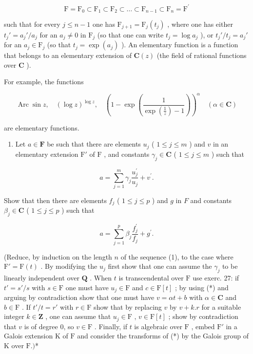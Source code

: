 \[
\mathrm{F} = \mathrm{F} _ {0} \subset \mathrm{F} _ {1} \subset \mathrm{F} _ {2} \subset \dots \subset \mathrm{F} _ {n - 1} \subset \mathrm{F} _ {n} = \mathrm{F} ^ {\prime}\tag{1}
\]

such that for every \(j \leqslant n - 1\) one has \(\mathrm{F}_{j + 1} = \mathrm{F}_j(t_j)\) , where one has either \(t_j' = a_j' / a_j\) for an \(a_j \neq 0\) in \(\mathrm{F}_j\) (so that one can write \(t_j = \log a_j\) ), or \(t_j' / t_j = a_j'\) for an \(a_j \in \mathrm{F}_j\) (so that \(t_j = \exp(a_j)\) ). An elementary function is a function that belongs to an elementary extension of \(\mathbf{C}(z)\) (the field of rational functions over \(\mathbf{C}\) ).

For example, the functions

\[
\operatorname{Arc} \sin z, \quad (\log z) ^ {\log z}, \quad \left(1 - \exp \left(\frac {1}{\exp \left(\frac {1}{z}\right) - 1}\right)\right) ^ {\alpha} \quad (\alpha \in \mathbf {C})
\]

are elementary functions.

\begin{enumerate}
\def\labelenumi{\alph{enumi})}
\setcounter{enumi}{1}
\tightlist
\item
  Let \(a \in \mathbf{F}\) be such that there are elements \(u_{j}\) ( \(1 \leqslant j \leqslant m\) ) and \(v\) in an elementary extension \(\mathrm{F}'\) of \(\mathrm{F}\) , and constants \(\gamma_{j} \in \mathbf{C}\) ( \(1 \leqslant j \leqslant m\) ) such that
\end{enumerate}

\[
a = \sum_ {j = 1} ^ {m} \gamma_ {j} \frac {u _ {j} ^ {\prime}}{u _ {j}} + v ^ {\prime}.\tag{*}
\]

Show that then there are elements \(f_{j}\) ( \(1 \leqslant j \leqslant p\) ) and \(g\) in \(F\) and constants \(\beta_{j} \in \mathbf{C}\) ( \(1 \leqslant j \leqslant p\) ) such that

\[
a = \sum_ {j = 1} ^ {p} \beta_ {j} \frac {f _ {j} ^ {\prime}}{f _ {j}} + g ^ {\prime}.\tag{**}
\]

(Reduce, by induction on the length \(n\) of the sequence (1), to the case where \(\mathrm{F}' = \mathrm{F}(t)\) . By modifying the \(u_{j}\) first show that one can assume the \(\gamma_{j}\) to be linearly independent over \(\mathbf{Q}\) . When \(t\) is transcendental over \(\mathrm{F}\) use exerc. 27: if \(t' = s'/s\) with \(s \in \mathrm{F}\) one must have \(u_{j} \in \mathrm{F}\) and \(c \in \mathrm{F}[t]\) ; by using (*) and arguing by contradiction show that one must have \(v = \alpha t + b\) with \(\alpha \in \mathbf{C}\) and \(b \in \mathrm{F}\) . If \(t'/t = r'\) with \(r \in \mathrm{F}\) show that by replacing \(v\) by \(v + k.r\) for a suitable integer \(k \in \mathbf{Z}\) , one can assume that \(u_{j} \in \mathrm{F}\) , \(v \in \mathrm{F}[t]\) ; show by contradiction that \(v\) is of degree 0, so \(v \in \mathrm{F}\) . Finally, if \(t\) is algebraic over \(\mathrm{F}\) , embed \(\mathrm{F}'\) in a Galois extension \(\mathrm{K}\) of \(\mathrm{F}\) and consider the transforms of (*) by the Galois group of \(\mathrm{K}\) over \(\mathrm{F}.)\)*

